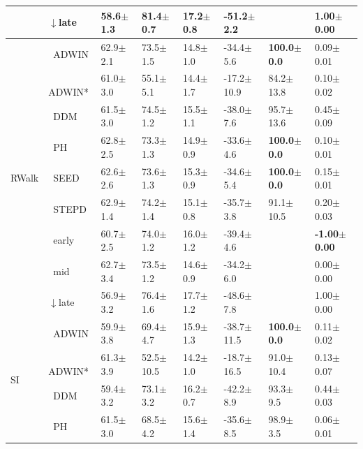 \begin{tabular}{llllllll}
 & $\downarrow$late & 58.6\tiny{$\pm$1.3} & \textbf{81.4\tiny{$\pm$0.7}} & 17.2\tiny{$\pm$0.8} & -51.2\tiny{$\pm$2.2} &  & 1.00\tiny{$\pm$0.00} \\
\midrule
\multirow[t]{9}{*}{RWalk} & $\ \;$ADWIN & 62.9\tiny{$\pm$2.1} & 73.5\tiny{$\pm$1.5} & 14.8\tiny{$\pm$1.0} & -34.4\tiny{$\pm$5.6} & \textbf{100.0\tiny{$\pm$0.0}} & 0.09\tiny{$\pm$0.01} \\
 & $\ \;$ADWIN* & 61.0\tiny{$\pm$3.0} & 55.1\tiny{$\pm$5.1} & 14.4\tiny{$\pm$1.7} & -17.2\tiny{$\pm$10.9} & 84.2\tiny{$\pm$13.8} & 0.10\tiny{$\pm$0.02} \\
 & $\ \;$DDM & 61.5\tiny{$\pm$3.0} & 74.5\tiny{$\pm$1.2} & 15.5\tiny{$\pm$1.1} & -38.0\tiny{$\pm$7.6} & 95.7\tiny{$\pm$13.6} & 0.45\tiny{$\pm$0.09} \\
 & $\ \;$PH & 62.8\tiny{$\pm$2.5} & 73.3\tiny{$\pm$1.3} & 14.9\tiny{$\pm$0.9} & -33.6\tiny{$\pm$4.6} & \textbf{100.0\tiny{$\pm$0.0}} & 0.10\tiny{$\pm$0.01} \\
 & $\ \;$SEED & 62.6\tiny{$\pm$2.6} & 73.6\tiny{$\pm$1.3} & 15.3\tiny{$\pm$0.9} & -34.6\tiny{$\pm$5.4} & \textbf{100.0\tiny{$\pm$0.0}} & 0.15\tiny{$\pm$0.01} \\
 & $\ \;$STEPD & 62.9\tiny{$\pm$1.4} & 74.2\tiny{$\pm$1.4} & 15.1\tiny{$\pm$0.8} & -35.7\tiny{$\pm$3.8} & 91.1\tiny{$\pm$10.5} & 0.20\tiny{$\pm$0.03} \\
 & $\ \;$early & 60.7\tiny{$\pm$2.5} & 74.0\tiny{$\pm$1.2} & 16.0\tiny{$\pm$1.2} & -39.4\tiny{$\pm$4.6} &  & \textbf{-1.00\tiny{$\pm$0.00}} \\
 & $\ \;$mid & 62.7\tiny{$\pm$3.4} & 73.5\tiny{$\pm$1.2} & 14.6\tiny{$\pm$0.9} & -34.2\tiny{$\pm$6.0} &  & 0.00\tiny{$\pm$0.00} \\
 & $\downarrow$late & 56.9\tiny{$\pm$3.2} & 76.4\tiny{$\pm$1.6} & 17.7\tiny{$\pm$1.2} & -48.6\tiny{$\pm$7.8} &  & 1.00\tiny{$\pm$0.00} \\
\midrule
\multirow[t]{9}{*}{SI} & $\ \;$ADWIN & 59.9\tiny{$\pm$3.8} & 69.4\tiny{$\pm$4.7} & 15.9\tiny{$\pm$1.3} & -38.7\tiny{$\pm$11.5} & \textbf{100.0\tiny{$\pm$0.0}} & 0.11\tiny{$\pm$0.02} \\
 & $\ \;$ADWIN* & 61.3\tiny{$\pm$3.9} & 52.5\tiny{$\pm$10.5} & 14.2\tiny{$\pm$1.0} & -18.7\tiny{$\pm$16.5} & 91.0\tiny{$\pm$10.4} & 0.13\tiny{$\pm$0.07} \\
 & $\ \;$DDM & 59.4\tiny{$\pm$3.2} & 73.1\tiny{$\pm$3.2} & 16.2\tiny{$\pm$0.7} & -42.2\tiny{$\pm$8.9} & 93.3\tiny{$\pm$9.5} & 0.44\tiny{$\pm$0.03} \\
 & $\ \;$PH & 61.5\tiny{$\pm$3.0} & 68.5\tiny{$\pm$4.2} & 15.6\tiny{$\pm$1.4} & -35.6\tiny{$\pm$8.5} & 98.9\tiny{$\pm$3.5} & 0.06\tiny{$\pm$0.01} \\

\end{tabular}
